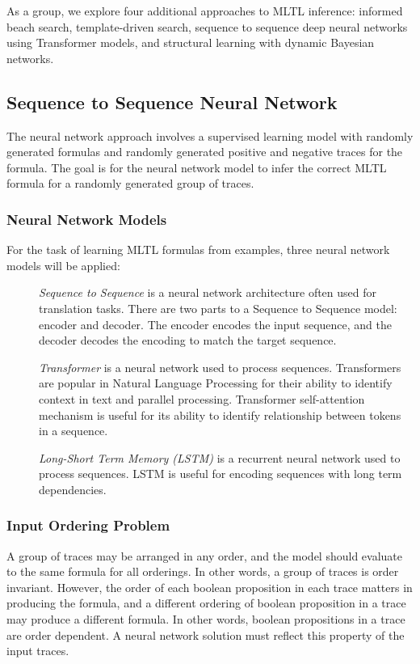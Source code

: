 \documentclass[runningheads]{llncs}
\begin{document}
As a group, we explore four additional approaches to MLTL inference: informed beach search, template-driven search, sequence to sequence deep neural networks using Transformer models, and structural learning with dynamic Bayesian networks.

\subsection{Sequence to Sequence Neural Network}
The neural network approach involves a supervised learning model with randomly generated formulas and randomly generated positive and negative traces for the formula. The goal is for the neural network model to infer the correct MLTL formula for a randomly generated group of traces.
\subsubsection{Neural Network Models}
For the task of learning MLTL formulas from examples, three neural network models will be applied:
\begin{description}
\item[] \textit{Sequence to Sequence} is a neural network architecture often used for translation tasks. There are two parts to a Sequence to Sequence model: encoder and decoder. The encoder encodes the input sequence, and the decoder decodes the encoding to match the target sequence. 
\item[] \textit{Transformer} is a neural network used to process sequences. Transformers are popular in Natural Language Processing for their ability to identify context in text and parallel processing. Transformer self-attention mechanism is useful for its ability to identify relationship between tokens in a sequence.
\item[] \textit{Long-Short Term Memory (LSTM)} is a recurrent neural network used to process sequences. LSTM is useful for encoding sequences with long term dependencies. 
\end{description}
\subsubsection{Input Ordering Problem}
A group of traces may be arranged in any order, and the model should evaluate to the same formula for all orderings. In other words, a group of traces is order invariant. However, the order of each boolean proposition in each trace matters in producing the formula, and a different ordering of boolean proposition in a trace may produce a different formula. In other words, boolean propositions in a trace are order dependent. A neural network solution must reflect this property of the input traces.
\end{document}
